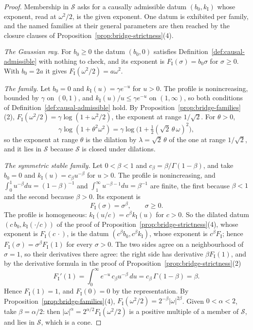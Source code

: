 \begin{proof}
Membership in $\mathcal{S}$ asks for a causally admissible datum $(b_0, k_{\mathrm I})$ whose
exponent, read at $\omega^2/2$, is the given exponent. One datum is exhibited per family, and the
named families at their general parameters are then reached by the closure clauses of
Proposition~\ref{prop:bridge-strictness}(4).

\emph{The Gaussian ray.} For $b_0 \ge 0$ the datum $(b_0, 0)$ satisfies
Definition~\ref{def:causal-admissible} with nothing to check, and its exponent is
$F_{\mathrm I}(\sigma) = b_0\sigma$ for $\sigma \ge 0$. With $b_0 = 2a$ it gives
$F_{\mathrm I}(\omega^2/2) = a\omega^2$.

\emph{The \Matern{} family.} Let $b_0 = 0$ and $k_{\mathrm I}(u) = \gamma e^{-u}$ for $u > 0$. The
profile is nonincreasing, bounded by $\gamma$ on $(0,1)$, and $k_{\mathrm I}(u)/u \le \gamma
e^{-u}$ on $(1,\infty)$, so both conditions of Definition~\ref{def:causal-admissible} hold. By
Proposition~\ref{prop:bridge-families}(2), $F_{\mathrm I}(\omega^2/2) = \gamma\log(1 +
\omega^2/2)$, the \Matern{} exponent at range $1/\sqrt2$. For $\theta > 0$,
\[
  \gamma\log(1 + \theta^2\omega^2) = \gamma\log\bigl(1 + \tfrac12(\sqrt2\,\theta\,\omega)^2\bigr),
\]
so the \Matern{} exponent at range $\theta$ is the dilation by $\lambda = \sqrt2\,\theta$ of the one
at range $1/\sqrt2$, and it lies in $\mathcal{S}$ because $\mathcal{S}$ is closed under
dilations.

\emph{The symmetric stable family.} Let $0 < \beta < 1$ and $c_\beta = \beta/\Gamma(1-\beta)$,
and take $b_0 = 0$ and $k_{\mathrm I}(u) = c_\beta u^{-\beta}$ for $u > 0$. The profile is
nonincreasing, and $\int_0^1 u^{-\beta}du = (1-\beta)^{-1}$ and
$\int_1^\infty u^{-\beta-1}du = \beta^{-1}$ are finite, the first because $\beta < 1$ and the
second because $\beta > 0$. Its exponent is
\[
  F_{\mathrm I}(\sigma) = \sigma^\beta, \qquad \sigma \ge 0 .
\]
The profile is homogeneous: $k_{\mathrm I}(u/c) = c^\beta k_{\mathrm I}(u)$ for $c > 0$. So the
dilated datum $(c\,b_0, k_{\mathrm I}(\cdot/c))$ of the proof of
Proposition~\ref{prop:bridge-strictness}(4), whose exponent is $F_{\mathrm I}(c\,\cdot)$, is the
datum $(c^\beta b_0, c^\beta k_{\mathrm I})$, whose exponent is $c^\beta F_{\mathrm I}$; hence
$F_{\mathrm I}(\sigma) = \sigma^\beta F_{\mathrm I}(1)$ for every $\sigma > 0$. The two sides
agree on a neighbourhood of $\sigma = 1$, so their derivatives there agree: the right side has
derivative $\beta F_{\mathrm I}(1)$, and by the derivative formula in the proof of
Proposition~\ref{prop:bridge-strictness}(2)
\[
  F_{\mathrm I}'(1) = \int_0^\infty e^{-u}\,c_\beta u^{-\beta}\,du = c_\beta\,\Gamma(1-\beta)
  = \beta .
\]
Hence $F_{\mathrm I}(1) = 1$, and $F_{\mathrm I}(0) = 0$ by the representation. By
Proposition~\ref{prop:bridge-families}(4), $F_{\mathrm I}(\omega^2/2) = 2^{-\beta}|\omega|^{2\beta}$.
Given $0 < \alpha < 2$, take $\beta = \alpha/2$: then
$|\omega|^\alpha = 2^{\alpha/2}F_{\mathrm I}(\omega^2/2)$ is a positive multiple of a member of
$\mathcal{S}$, and lies in $\mathcal{S}$, which is a cone.
\end{proof}

